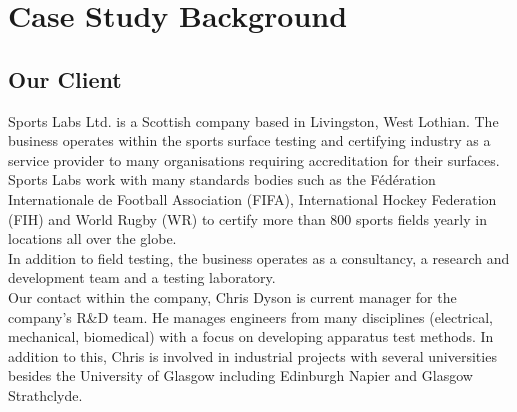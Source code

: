 \documentclass{l3proj}
\begin{document}
\section{Case Study Background}
\subsection{Our Client}
Sports Labs Ltd. is a Scottish company based in Livingston, West Lothian. The business operates within the sports surface testing and certifying industry as a service provider to many organisations requiring accreditation for their surfaces. Sports Labs work with many standards bodies such as the Fédération Internationale de Football Association (FIFA), International Hockey Federation (FIH) and World Rugby (WR) to certify more than 800 sports fields yearly in locations all over the globe. \\
In addition to field testing, the business  operates as a consultancy, a research and development team and a testing laboratory.\\
Our contact within the company, Chris Dyson is current manager for the company's R\&D team. He manages engineers from many disciplines (electrical, mechanical, biomedical) with a focus on developing apparatus test methods. In addition to this, Chris is involved in industrial projects with several universities besides the University of Glasgow including Edinburgh Napier and Glasgow Strathclyde.  
\end{document}
